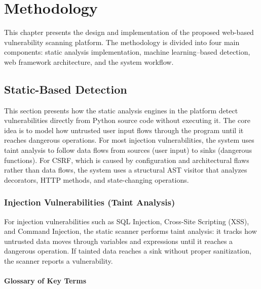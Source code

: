 \chapter{Methodology}
\label{ch:methods}

This chapter presents the design and implementation of the proposed web-based vulnerability scanning platform. The methodology is divided into four main components: static analysis implementation, machine learning--based detection, web framework architecture, and the system workflow.

\section{Static-Based Detection}
\label{sec:static_detection}

This section presents how the static analysis engines in the platform detect vulnerabilities directly from Python source code without executing it. The core idea is to model how untrusted user input flows through the program until it reaches dangerous operations. For most injection vulnerabilities, the system uses taint analysis to follow data flows from sources (user input) to sinks (dangerous functions). For CSRF, which is caused by configuration and architectural flaws rather than data flows, the system uses a structural AST visitor that analyzes decorators, HTTP methods, and state-changing operations.

\subsection{Injection Vulnerabilities (Taint Analysis)}
\label{sec:static_taint}

For injection vulnerabilities such as SQL Injection, Cross-Site Scripting (XSS), and Command Injection, the static scanner performs taint analysis: it tracks how untrusted data moves through variables and expressions until it reaches a dangerous operation. If tainted data reaches a sink without proper sanitization, the scanner reports a vulnerability.

\subsubsection*{Glossary of Key Terms}
\label{sec:static_glossary}

